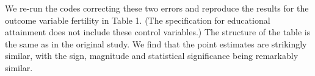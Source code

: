 \documentclass[12pt,a4paper]{article}
\begin{document}
\begin{spacing}{1.5}
We re-run the codes correcting these two errors and reproduce the results for the outcome variable fertility in Table 1. (The specification for educational attainment does not include these control variables.) The structure of the table is the same as in the original study. We find that the point estimates are strikingly similar, with the sign, magnitude and statistical significance being remarkably similar.
\end{spacing}

%
%
%
%
\end{document}
